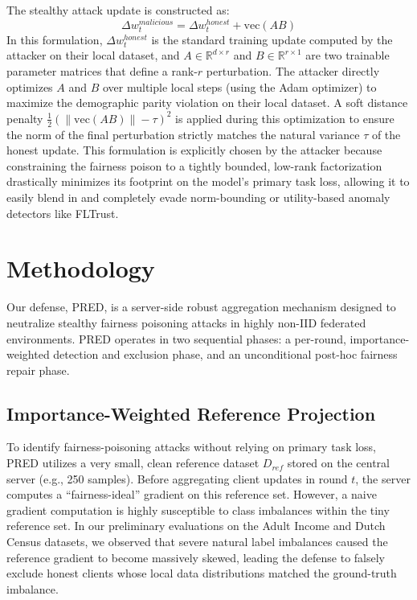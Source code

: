 \documentclass[journal]{IEEEtran}
\begin{document}
The stealthy attack update is constructed as:
\begin{equation}
\Delta w_t^{malicious} = \Delta w_t^{honest} + \text{vec}(AB)
\end{equation}
In this formulation, $\Delta w_t^{honest}$ is the standard training update computed by the attacker on their local dataset, and $A \in \mathbb{R}^{d \times r}$ and $B \in \mathbb{R}^{r \times 1}$ are two trainable parameter matrices that define a rank-$r$ perturbation. The attacker directly optimizes $A$ and $B$ over multiple local steps (using the Adam optimizer) to maximize the demographic parity violation on their local dataset. A soft distance penalty $\frac{1}{2} (\|\text{vec}(AB)\| - \tau)^2$ is applied during this optimization to ensure the norm of the final perturbation strictly matches the natural variance $\tau$ of the honest update. This formulation is explicitly chosen by the attacker because constraining the fairness poison to a tightly bounded, low-rank factorization drastically minimizes its footprint on the model's primary task loss, allowing it to easily blend in and completely evade norm-bounding or utility-based anomaly detectors like FLTrust.

\section{Methodology}
Our defense, PRED, is a server-side robust aggregation mechanism designed to neutralize stealthy fairness poisoning attacks in highly non-IID federated environments. PRED operates in two sequential phases: a per-round, importance-weighted detection and exclusion phase, and an unconditional post-hoc fairness repair phase.

\subsection{Importance-Weighted Reference Projection}
To identify fairness-poisoning attacks without relying on primary task loss, PRED utilizes a very small, clean reference dataset $D_{ref}$ stored on the central server (e.g., 250 samples). Before aggregating client updates in round $t$, the server computes a ``fairness-ideal'' gradient on this reference set. However, a naive gradient computation is highly susceptible to class imbalances within the tiny reference set. In our preliminary evaluations on the Adult Income and Dutch Census datasets, we observed that severe natural label imbalances caused the reference gradient to become massively skewed, leading the defense to falsely exclude honest clients whose local data distributions matched the ground-truth imbalance.
\end{document}
